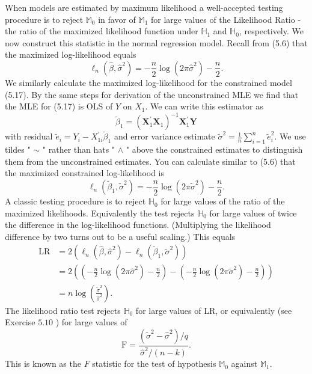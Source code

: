 \documentclass[10pt]{article}
\begin{document}
When models are estimated by maximum likelihood a well-accepted testing procedure is to reject $\mathbb{M}_{0}$ in favor of $\mathbb{M}_{1}$ for large values of the Likelihood Ratio - the ratio of the maximized likelihood function under $\mathbb{H}_{1}$ and $\mathbb{H}_{0}$, respectively. We now construct this statistic in the normal regression model. Recall from (5.6) that the maximized log-likelihood equals
$$
\ell_{n}\left(\widehat{\beta}, \widehat{\sigma}^{2}\right)=-\frac{n}{2} \log \left(2 \pi \widehat{\sigma}^{2}\right)-\frac{n}{2} .
$$
We similarly calculate the maximized log-likelihood for the constrained model (5.17). By the same steps for derivation of the unconstrained MLE we find that the MLE for (5.17) is OLS of $Y$ on $X_{1}$. We can write this estimator as
$$
\widetilde{\beta}_{1}=\left(\boldsymbol{X}_{1}^{\prime} \boldsymbol{X}_{1}\right)^{-1} \boldsymbol{X}_{1}^{\prime} \boldsymbol{Y}
$$
with residual $\widetilde{e}_{i}=Y_{i}-X_{1 i}^{\prime} \widetilde{\beta}_{1}$ and error variance estimate $\widetilde{\sigma}^{2}=\frac{1}{n} \sum_{i=1}^{n} \widetilde{e}_{i}^{2}$. We use tildes " $\sim$ " rather than hats " $\wedge$ " above the constrained estimates to distinguish them from the unconstrained estimates. You can calculate similar to (5.6) that the maximized constrained log-likelihood is
$$
\ell_{n}\left(\widetilde{\beta}_{1}, \widetilde{\sigma}^{2}\right)=-\frac{n}{2} \log \left(2 \pi \widetilde{\sigma}^{2}\right)-\frac{n}{2} .
$$
A classic testing procedure is to reject $\mathbb{H}_{0}$ for large values of the ratio of the maximized likelihoods. Equivalently the test rejects $\mathbb{H}_{0}$ for large values of twice the difference in the log-likelihood functions. (Multiplying the likelihood difference by two turns out to be a useful scaling.) This equals
$$
\begin{aligned}
\mathrm{LR} &=2\left(\ell_{n}\left(\widehat{\beta}, \widehat{\sigma}^{2}\right)-\ell_{n}\left(\widetilde{\beta}_{1}, \widetilde{\sigma}^{2}\right)\right) \\
&=2\left(\left(-\frac{n}{2} \log \left(2 \pi \widehat{\sigma}^{2}\right)-\frac{n}{2}\right)-\left(-\frac{n}{2} \log \left(2 \pi \widetilde{\sigma}^{2}\right)-\frac{n}{2}\right)\right) \\
&=n \log \left(\frac{\widetilde{\sigma}^{2}}{\widehat{\sigma}^{2}}\right) .
\end{aligned}
$$
The likelihood ratio test rejects $\mathbb{H}_{0}$ for large values of LR, or equivalently (see Exercise $5.10$ ) for large values of
$$
\mathrm{F}=\frac{\left(\widetilde{\sigma}^{2}-\widehat{\sigma}^{2}\right) / q}{\widehat{\sigma}^{2} /(n-k)} .
$$
This is known as the $F$ statistic for the test of hypothesis $\mathbb{M}_{0}$ against $\mathbb{M}_{1}$.
\end{document}
